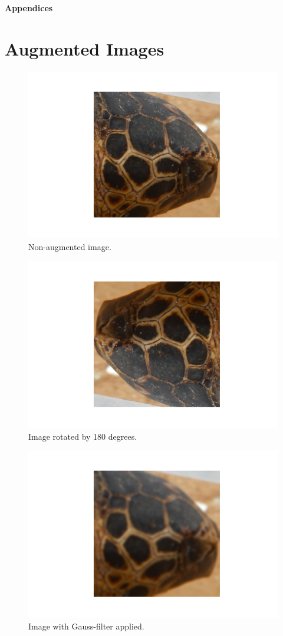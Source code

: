 \appendix
\Huge{\textbf{Appendices}}

\section{Augmented Images}\label{apx:augmentedImages}

\begin{figure}[h]
    \centering
    \includegraphics{images/turtles/base.png}
    \caption{Non-augmented image.}
    \label{fig:turtleBase}
\end{figure}

\begin{figure}[h!]
    \centering
    \includegraphics{images/turtles/rotated.png}
    \caption{Image rotated by 180 degrees.}
    \label{fig:turtleRotated}
\end{figure}

\begin{figure}[h!]
    \centering
    \includegraphics{images/turtles/gaussian.png}
    \caption{Image with Gauss-filter applied.}
    \label{fig:turtleGauss}
\end{figure}

